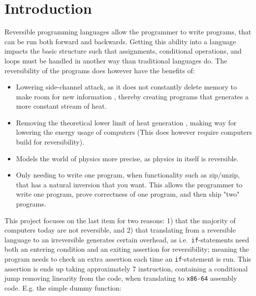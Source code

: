 
\section{Introduction }
Reversible programming languages allow the programmer to write programs, that can be run
both forward and backwards. Getting this ability into a language impacts the basic structure
such that assignments, conditional operations, and loops must be handled in another way
than traditional languages do. The reversibility of the programs does however have the benefits
of:

\begin{itemize}
    \item Lowering side-channel attack, as it does not constantly delete memory to make room for
    new information \cite{hermes}, thereby creating programs that generates a more constant
    stream of heat.

    \item Removing the theoretical lower limit of heat generation \cite{article:3}, making way
    for lowering the energy usage of computers (This does however require computers build
    for reversibility).

    \item Models the world of physics more precise, as physics in itself is reversible.

    \item Only needing to write one program, when functionality such as zip/unzip, that has
    a natural inversion that you want. This allows the programmer to write one program, prove
    correctness of one program, and then ship "two" programs.
\end{itemize}
\noindent
This project focuses on the last item for two reasons: 1) that the majority of computers today are
not reversible, and 2) that translating from a reversible language to an irreversible
generates certain overhead, as i.e.\ \texttt{if}-statements need both an entering condition and an
exiting assertion for reversibility; meaning the program needs to check an extra assertion each
time an \texttt{if}-statement is run. This assertion is ends up taking approximately 7 instruction,
containing a conditional jump removing linearity from the code, when translating to
\texttt{x86-64} assembly code. E.g. the simple dummy function:

